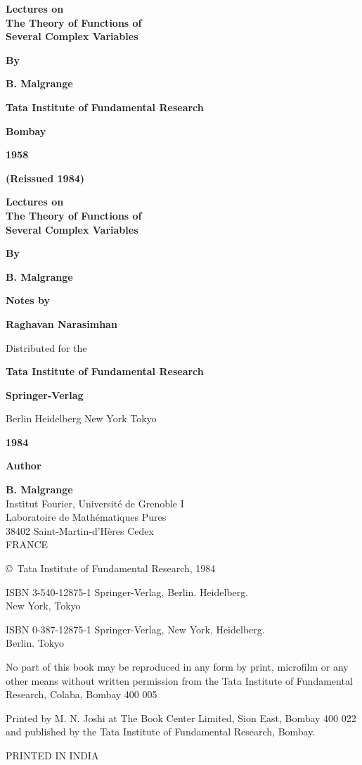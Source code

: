 \thispagestyle{empty}

\begin{center}
{\Large\bf Lectures on}\\[5pt]
{\Large\bf The Theory of Functions of}\\[5pt]
{\Large\bf Several Complex Variables}
\vskip 1cm

{\bf By}
\medskip

{\large\bf B. Malgrange}
\vfill

{\bf Tata Institute of Fundamental Research}

{\bf Bombay}

{\bf 1958}

{\bf (Reissued 1984)}
\end{center}
\eject

\thispagestyle{empty}
\begin{center}
{\Large\bf Lectures on}\\[5pt]
{\Large\bf The Theory of Functions of}\\[5pt]
{\Large\bf Several Complex Variables}
\vskip 1cm

{\bf By}
\medskip

{\large\bf B. Malgrange}
\vfill

{\bf Notes by}
\medskip

{\large\bf Raghavan Narasimhan}
\vfill

{Distributed for the}

{\bf Tata Institute of Fundamental Research}

{\bf Springer-Verlag}

{Berlin Heidelberg New York Tokyo}

{\bf 1984}
\end{center}
\eject

\thispagestyle{empty}
\begin{center}
{\bf Author}
\medskip

{\large\bf B. Malgrange}\\
{Institut Fourier, Universit\'e de Grenoble I}\\
{Laboratoire de Math\'ematiques Pures}\\
{38402 Saint-Martin-d'H\`eres Cedex}\\
{FRANCE}
\vfill

{\copyright\ Tata Institute of Fundamental Research, 1984}
\bigskip

{ISBN 3-540-12875-1 Springer-Verlag, Berlin. Heidelberg.\\ New York, Tokyo}

{ISBN 0-387-12875-1 Springer-Verlag, New York, Heidelberg.\\ Berlin. Tokyo}
\vfill


\parbox{0.7\textwidth}{No part of this book may be reproduced in any form by
print, microfilm or any other means without written permission from the 
Tata Institute of Fundamental Research, Colaba, Bombay 400 005}
\vfill

Printed by M. N. Joshi at The Book Center Limited, Sion East, Bombay 400 022
and published by the Tata Institute of Fundamental Research, Bombay.
\bigskip


PRINTED IN INDIA
\end{center}




